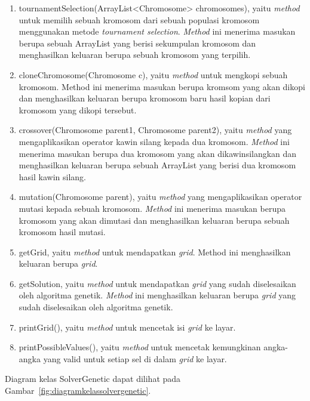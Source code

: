 \begin{enumerate}
\item tournamentSelection(ArrayList<Chromosome> chromosomes), yaitu \textit{method} untuk memilih sebuah kromosom dari sebuah populasi kromosom menggunakan metode \textit{tournament selection}. \textit{Method} ini menerima masukan berupa sebuah ArrayList yang berisi sekumpulan kromosom dan menghasilkan keluaran berupa sebuah kromosom yang terpilih.
\item cloneChromosome(Chromosome c), yaitu \textit{method} untuk mengkopi sebuah kromosom. Method ini menerima masukan berupa kromsom yang akan dikopi dan menghasilkan keluaran berupa kromosom baru hasil kopian dari kromosom yang dikopi tersebut.
\item crossover(Chromosome parent1, Chromosome parent2), yaitu \textit{method} yang mengaplikasikan operator kawin silang kepada dua kromosom. \textit{Method} ini menerima masukan berupa dua kromosom yang akan dikawinsilangkan dan menghasilkan keluaran berupa sebuah ArrayList yang berisi dua kromosom hasil kawin silang.
\item mutation(Chromosome parent), yaitu \textit{method} yang mengaplikasikan operator mutasi kepada sebuah kromosom. \textit{Method} ini menerima masukan berupa kromosom yang akan dimutasi dan menghasilkan keluaran berupa sebuah kromosom hasil mutasi.
\item getGrid, yaitu \textit{method} untuk mendapatkan \textit{grid}. Method ini menghasilkan keluaran berupa \textit{grid}.
\item getSolution, yaitu \textit{method} untuk mendapatkan \textit{grid} yang sudah diselesaikan oleh algoritma genetik. \textit{Method} ini menghasilkan keluaran berupa \textit{grid} yang sudah diselesaikan oleh algoritma genetik.
\item printGrid(), yaitu \textit{method} untuk mencetak isi \textit{grid} ke layar.
\item printPossibleValues(), yaitu \textit{method} untuk mencetak kemungkinan angka-angka yang valid untuk setiap sel di dalam \textit{grid} ke layar.
\end{enumerate}

Diagram kelas SolverGenetic dapat dilihat pada Gambar~\ref{fig:diagramkelassolvergenetic}.


